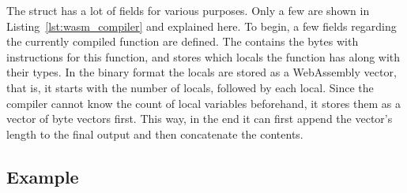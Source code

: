The  struct has a lot of fields for various purposes.
Only a few are shown in Listing~\ref{lst:wasm_compiler} and explained here.
To begin, a few fields regarding the currently compiled function are defined.
The  contains the bytes with instructions for this function, and  stores which locals the function has along with their types.
In the binary format the locals are stored as a WebAssembly vector, that is, it starts with the number of locals, followed by each local.
Since the compiler cannot know the count of local variables beforehand, it stores them as a vector of byte vectors first.
This way, in the end it can first append the vector's length to the final output and then concatenate the contents.



\subsection{Example}

